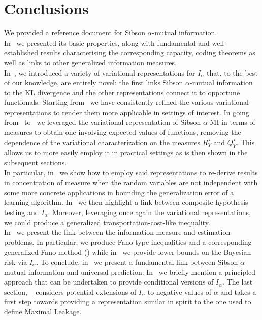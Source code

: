 \documentclass{article}
\numberwithin{theorem}{section}
\numberwithin{example}{section}
\numberwithin{remark}{section}
\numberwithin{definition}{section}
\begin{document}
\section{Conclusions}
We provided a reference document for Sibson $\alpha$-mutual information.\\ In~ we presented its basic properties, along with fundamental and well-established results characterising the corresponding capacity, coding theorems as well as links to other generalized information measures.\\
In~, we introduced a variety of variational representations for $I_\alpha$ that, to the best of our knowledge, are entirely novel: the first links Sibson $\alpha$-mutual information to the KL divergence and the other representations connect it to opportune functionals. Starting from~ we have consistently refined the various variational representations to render them more applicable in settings of interest. In going from~ to~ we leveraged the variational representation of Sibson $\alpha$-MI in terms of measures to obtain one involving expected values of functions, removing the dependence of the variational characterization on the measures $R_Y^\star$ and $Q_Y^\star$. This allows us to more easily employ it in practical settings as is then shown in the subsequent sections.\\
In particular, in~ we show how to employ said representations to re-derive results in concentration of measure when the random variables are not independent with some more concrete applications in bounding the generalization error of a learning algorithm. In~ we then highlight a link between composite hypothesis testing and $I_\alpha$. Moreover, leveraging once again the variational representations, we could produce a generalized transportation-cost-like inequality.\\In~ we present the link between the information measure and estimation problems. In particular, we produce Fano-type inequalities and a corresponding generalized Fano method () while in~ we provide lower-bounds on the Bayesian risk via $I_\alpha$. To conclude, in~ we present a fundamental link between Sibson $\alpha$-mutual information and universal prediction.
In~ we briefly mention a principled approach that can be undertaken to provide conditional versions of $I_\alpha$. The last section, ~ considers potential extensions of $I_\alpha$ to negative values of $\alpha$ and takes a first step towards providing a representation similar in spirit to the one used to define Maximal Leakage.
\end{document}
